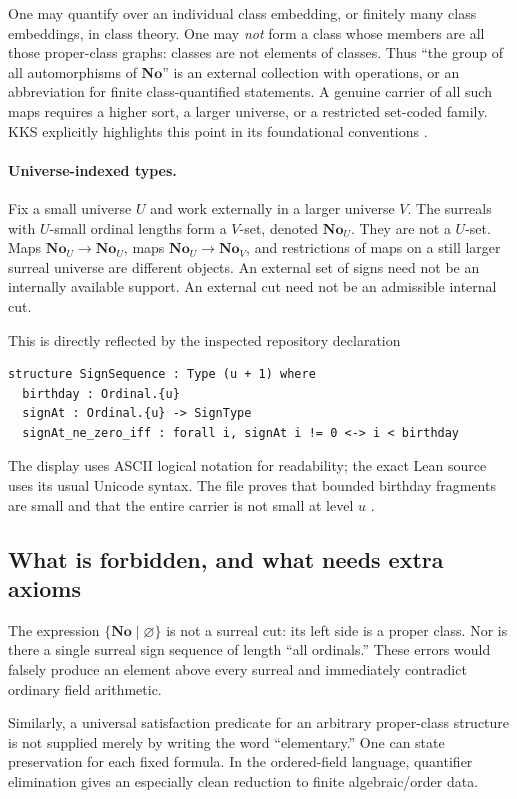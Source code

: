 \documentclass[11pt,a4paper]{article}
\numberwithin{equation}{section}
\theoremstyle{plain}
\theoremstyle{definition}
\theoremstyle{remark}
\newcommand{\No}{\mathbf{No}}
\begin{document}
One may quantify over an individual class embedding, or finitely many
class embeddings, in class theory. One may \emph{not} form a class whose
members are all those proper-class graphs: classes are not elements of
classes. Thus ``the group of all automorphisms of $\No$'' is an external
collection with operations, or an abbreviation for finite class-quantified
statements. A genuine carrier of all such maps requires a higher sort,
a larger universe, or a restricted set-coded family. KKS explicitly
highlights this point in its foundational conventions \cite{KKS}.

\paragraph{Universe-indexed types.}
Fix a small universe $U$ and work externally in a larger universe $V$.
The surreals with $U$-small ordinal lengths form a $V$-set, denoted
$\No_U$. They are not a $U$-set. Maps $\No_U\to\No_U$, maps
$\No_U\to\No_V$, and restrictions of maps on a still larger surreal
universe are different objects. An external set of signs need not be an
internally available support. An external cut need not be an admissible
internal cut.

This is directly reflected by the inspected repository declaration
\begin{verbatim}
structure SignSequence : Type (u + 1) where
  birthday : Ordinal.{u}
  signAt : Ordinal.{u} -> SignType
  signAt_ne_zero_iff : forall i, signAt i != 0 <-> i < birthday
\end{verbatim}
The display uses ASCII logical notation for readability; the exact Lean
source uses its usual Unicode syntax. The file proves that bounded birthday
fragments are small and that the entire carrier is not small at level $u$
\cite{RepoSigns}.

\subsection{What is forbidden, and what needs extra axioms}
The expression $\{\No\mid\varnothing\}$ is not a surreal cut: its left side
is a proper class. Nor is there a single surreal sign sequence of length
``all ordinals.'' These errors would falsely produce an element above every
surreal and immediately contradict ordinary field arithmetic.

Similarly, a universal satisfaction predicate for an arbitrary proper-class
structure is not supplied merely by writing the word ``elementary.'' One
can state preservation for each fixed formula. In the ordered-field
language, quantifier elimination gives an especially clean reduction to
finite algebraic/order data.
\end{document}
